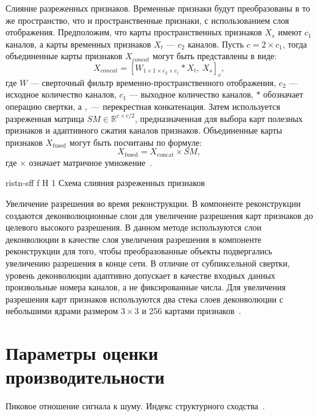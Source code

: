 \documentclass{bmstu}
\begin{document}
Слияние разреженных признаков. 
Временные признаки будут преобразованы в то же пространство, что и пространственные признаки, с использованием слоя отображения. 
Предположим, что карты пространственных признаков $X_s$ имеют $c_1$ каналов, а карты временных признаков $X_t$ --- $c_2$ каналов. 
Пусть $c = 2 \times c_1$, тогда объединенные карты признаков $X_{concat}$ могут быть представлены в виде:
\begin{equation}
X_{concat} = [W_{1 \times 1 \times c_2 \times c_1} * X_t,~X_s]_{c},
\end{equation}
где $W$ --- сверточный фильтр временно-пространственного отображения, $c_2$ --- исходное количество каналов, $c_1$ --- выходное количество каналов, $*$ обозначает операцию свертки, а $,$ --- перекрестная конкатенация. 
Затем используется разреженная матрица $SM \in \mathbb{R}^{c \times c/2}$, предназначенная для выбора карт полезных признаков и адаптивного сжатия каналов признаков. 
Объединенные карты признаков $X_{\text{fused}}$ могут быть посчитаны по формуле:
\begin{equation}
X_{\text{fused}} = X_{\text{concat}} \times SM,
\end{equation}
где $\times$ означает матричное умножение~\cite{Xiaobin2019}. 

    {ristn-sff}
    {f}
    {H}
    {1\textwidth}
    {Схема слияния разреженных признаков~\cite{Xiaobin2019}}

Увеличение разрешения во время реконструкции. 
В компоненте реконструкции создаются деконволюционные слои для увеличение разрешения карт признаков до целевого высокого разрешения. 
В данном методе используются слои деконволюции в качестве слоя увеличения разрешения в компоненте реконструкции для того, чтобы преобразованные объекты подвергались увеличению разрешения в конце сети. 
В отличие от субпиксельной свертки, уровень деконволюции адаптивно допускает в качестве входных данных произвольные номера каналов, а не фиксированные числа. 
Для увеличения разрешения карт признаков используются два стека слоев деконволюции с небольшими ядрами размером $3 \times 3$ и 256 картами признаков~\cite{Xiaobin2019}.

\section{Параметры оценки производительности}

Пиковое отношение сигнала к шуму. 
Индекс структурного сходства~\cite{Daithankar2021}.
\end{document}
